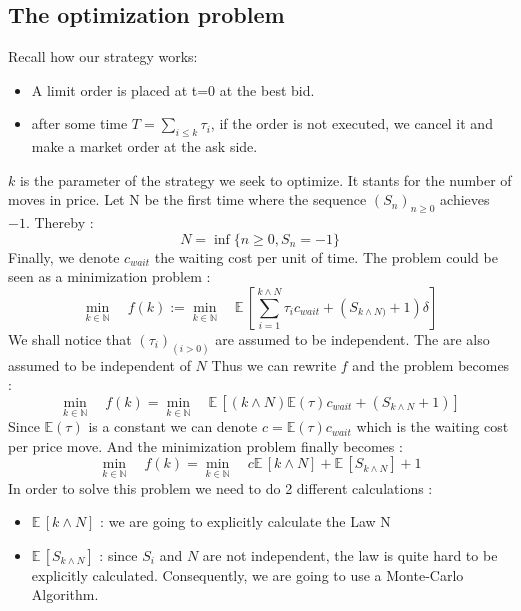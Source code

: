 \documentclass{article}
\newcommand{\Min}[2]{ {#1} \wedge {#2} }
\begin{document}
\subsection{The optimization problem}
Recall how our strategy works:
\begin{itemize}
	\item A limit order is placed at t=0 at the best bid.
	\item after some time $T = \sum_{i \leq k} \tau_i$, if the order is not executed, we cancel it and make a market order at the ask side.
\end{itemize}
$k$ is the parameter of the strategy we seek to optimize. It stants for the number of moves in price. 
Let N be the first time where the sequence $(S_{n})_{n\geq0}$  achieves $-1$. Thereby :
$$ N= \inf \{ n\geq0 , S_{n}=-1   \} $$
Finally, we denote $c_{wait}$ the waiting cost per unit of time.
The problem could be seen as a minimization problem  :
\begin{equation}
 \min\limits_{k \in \mathbb{N}} \quad f(k) := \min\limits_{k \in \mathbb{N}} \quad \mathbb{E}\,\left[ \sum_{i=1}^{\Min k N}\tau_i c_{wait} + (S_{\Min k N)}+1)\delta\right]
\end{equation}
We shall notice that $(\tau_i)_{(i>0)}$ are assumed to be independent. The are also assumed to be independent of $N$
Thus we can rewrite $f$ and the problem becomes : 
\begin{equation}
 \min\limits_{k \in \mathbb{N}} \quad f(k)= \min\limits_{k \in \mathbb{N}} \quad \mathbb{E}\,\left[ ({\Min k N})  \mathbb{E}(\tau) c_{wait} + (S_{\Min k N}+1) \right]
\end{equation}
Since $\mathbb{E}(\tau)$ is a constant we can denote
$c = \mathbb{E}(\tau) c_{wait}$ which is the waiting cost per price move. And the minimization problem finally becomes :
\begin{equation}
 \min\limits_{k \in \mathbb{N}} \quad f(k)= \min\limits_{k \in \mathbb{N}} \quad c \mathbb{E}\,\left[ {\Min k N}\right]   +  \mathbb{E}\,\left[S_{\Min k N}\right] +1
\end{equation}
In order to solve this problem we need to do 2 different calculations :
\begin{itemize}
\item $\mathbb{E}\,\left[ {\Min k N}\right]$ : we are going to explicitly calculate the Law N
\item $\mathbb{E}\,\left[S_{\Min k N}\right]$ : since $S_i$ and $N$ are not independent, the law is quite hard to be explicitly calculated. Consequently, we are going to use a Monte-Carlo Algorithm.
\end{itemize}
\end{document}
